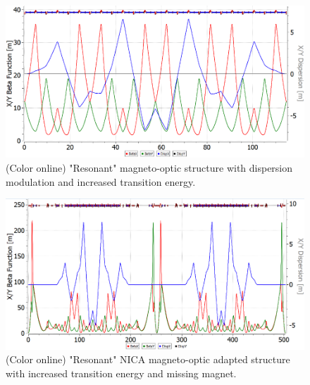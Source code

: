\documentclass[submitting]{nst}
\begin{document}
\begin{figure}[!htb]
\includegraphics[width=\hsize]{fig1_pure_resonant}
\caption{(Color online) "Resonant" magneto-optic structure with dispersion modulation and increased transition energy.}
\label{fig:pure_resonant}
\end{figure}
\begin{figure}[!htb]
\includegraphics[width=\hsize]{fig2_resonant.png}
\caption{(Color online) "Resonant" NICA magneto-optic adapted structure with increased transition energy and missing magnet.}
\label{fig:resonant}
\end{figure}
\end{document}
